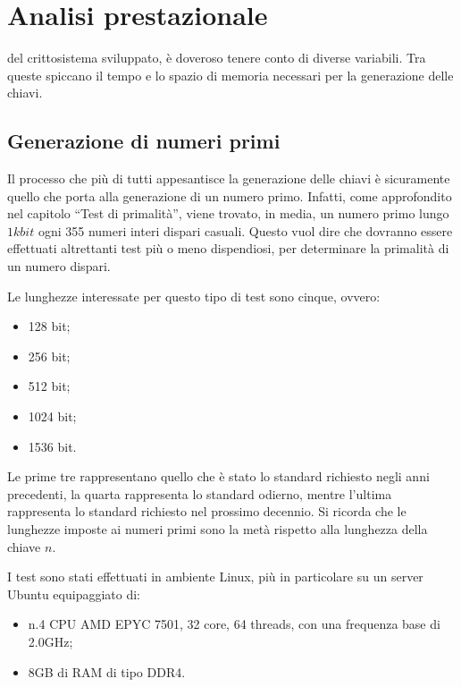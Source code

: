 
\chapter{Analisi prestazionale}

 del crittosistema sviluppato, è doveroso tenere conto di diverse variabili. Tra queste spiccano il tempo e lo spazio di memoria necessari per la generazione delle chiavi.

%
%
\section{Generazione di numeri primi}
%
%

Il processo che più di tutti appesantisce la generazione delle chiavi è sicuramente quello che porta alla generazione di un numero primo. Infatti, come approfondito nel capitolo ``Test di primalità'', viene trovato, in media, un numero primo lungo $1kbit$ ogni 355 numeri interi dispari casuali. Questo vuol dire che dovranno essere effettuati altrettanti test più o meno dispendiosi, per determinare la primalità di un numero dispari. 

Le lunghezze interessate per questo tipo di test sono cinque, ovvero:
\begin{itemize}
	\item 128 bit;
	\item 256 bit;
	\item 512 bit;
	\item 1024 bit;
	\item 1536 bit.
\end{itemize}

Le prime tre rappresentano quello che è stato lo standard richiesto negli anni precedenti, la quarta rappresenta lo standard odierno, mentre l'ultima rappresenta lo standard richiesto nel prossimo decennio. Si ricorda che le lunghezze imposte ai numeri primi sono la metà rispetto alla lunghezza della chiave $n$.

I test sono stati effettuati in ambiente Linux, più in particolare su un server Ubuntu equipaggiato di:
\begin{itemize}
	\item n.4 CPU AMD EPYC 7501, 32 core, 64 threads, con una frequenza base di 2.0GHz;
	\item 8GB di RAM di tipo DDR4.
\end{itemize}


